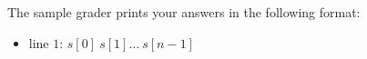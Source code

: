The sample grader prints your answers in the following format:
\begin{itemize}
\item line $1$: $s[0]\ s[1]\ldots \ s[n-1]$
\end{itemize}